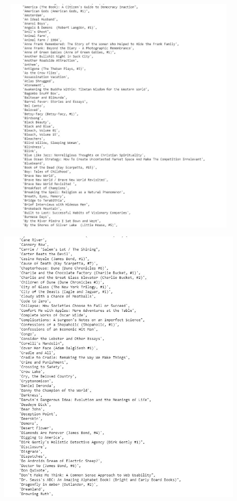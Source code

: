 \begin{center}
\includegraphics[width=14cm, height=12cm]{./Imagenes/traba9.jpg}
\end{center}


\begin{center}
\includegraphics[width=18cm, height=14cm]{./Imagenes/traba10.jpg}
\end{center}

